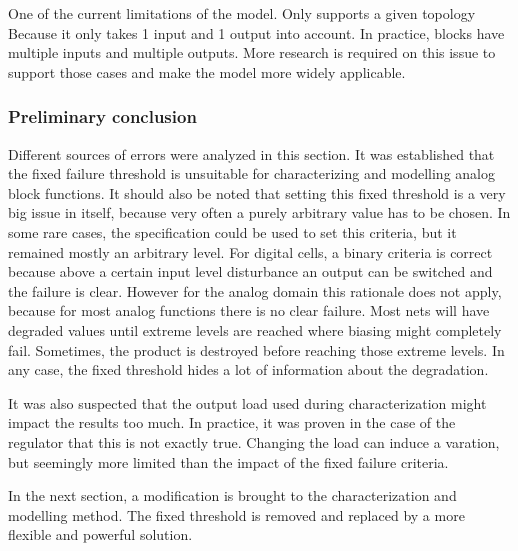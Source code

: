 One of the current limitations of the model.
Only supports a given topology
Because it only takes 1 input and 1 output into account.
In practice, blocks have multiple inputs and multiple outputs.
More research is required on this issue to support those cases and make the model more widely applicable.

\subsubsection{Preliminary conclusion}

Different sources of errors were analyzed in this section.
It was established that the fixed failure threshold is unsuitable for characterizing and modelling analog block functions.
It should also be noted that setting this fixed threshold is a very big issue in itself, because very often a purely arbitrary value has to be chosen.
In some rare cases, the specification could be used to set this criteria, but it remained mostly an arbitrary level.
For digital cells, a binary criteria is correct because above a certain input level disturbance an output can be switched and the failure is clear.
However for the analog domain this rationale does not apply, because for most analog functions there is no clear failure.
Most nets will have degraded values until extreme levels are reached where biasing might completely fail.
Sometimes, the product is destroyed before reaching those extreme levels.
In any case, the fixed threshold hides a lot of information about the degradation.

It was also suspected that the output load used during characterization might impact the results too much.
In practice, it was proven in the case of the regulator that this is not exactly true.
Changing the load can induce a varation, but seemingly more limited than the impact of the fixed failure criteria.

In the next section, a modification is brought to the characterization and modelling method.
The fixed threshold is removed and replaced by a more flexible and powerful solution.
